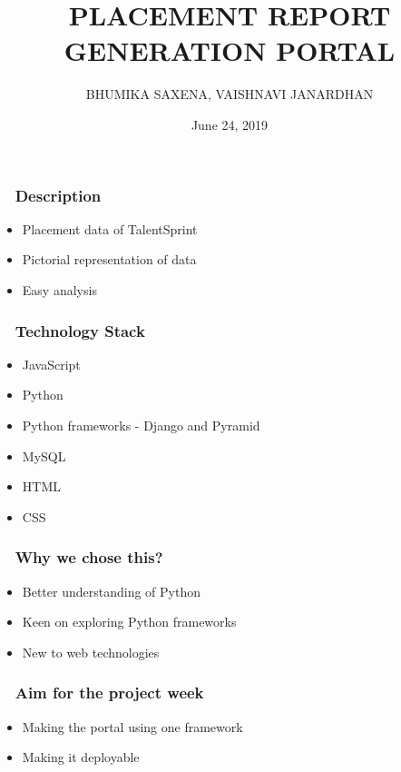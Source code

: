 \documentclass{beamer}
\title[Placement Report Generation Portal]{PLACEMENT REPORT GENERATION PORTAL } %
\author[Bhumika, Vaishnavi]{BHUMIKA SAXENA, VAISHNAVI JANARDHAN} %
{
\medskip
}
\date{June 24, 2019} %
\begin{document}
\begin{frame}
\titlepage %
\end{frame}

\begin{frame}
\frametitle{~ Description}
\begin {itemize}
\item{Placement data of TalentSprint}
\bigskip
\bigskip
\item{Pictorial representation of data}
\bigskip
\bigskip
\item{Easy analysis}
\end{itemize}
\end{frame}

\begin{frame}
\frametitle{ ~ Technology Stack} 
\begin{itemize}
\item{JavaScript}
\item{Python} 
\item{Python frameworks - Django and Pyramid}
\item{MySQL}
\item{HTML} 
\item{CSS}
\end{itemize}
\end{frame}

\begin{frame}
\frametitle{ ~ Why we chose this?} 
\begin{itemize}
\item{Better understanding of Python}
\item{Keen on exploring Python frameworks}
\item{New to web technologies} 
\end{itemize}
\end{frame}

\begin{frame}
\frametitle{ ~ Aim for the project week} 
\begin{itemize}
\item{Making the portal using one framework}
\item{Making it deployable}
\end{itemize}
\end{frame}
\end{document}
